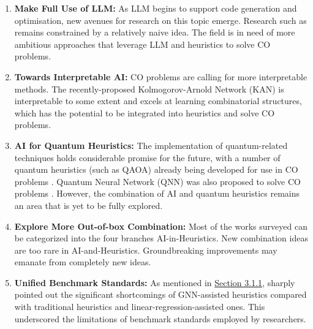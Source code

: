 \documentclass[a4paper]{article}
\begin{document}
\begin{enumerate}
    \item{\textbf{Make Full Use of LLM:}} As LLM begins to support code generation and optimisation, new avenues for research on this topic emerge. Research such as \citet{Ye} remains constrained by a relatively naive idea. The field is in need of more ambitious approaches that leverage LLM and heuristics to solve CO problems.
    \item{\textbf{Towards Interpretable AI:}} CO problems are calling for more interpretable methods. The recently-proposed Kolmogorov-Arnold Network (KAN) \citep{ZLiu} is interpretable to some extent and excels at learning combinatorial structures, which has the potential to be integrated into heuristics and solve CO problems.
    \item{\textbf{AI for Quantum Heuristics:}} The implementation of quantum-related techniques holds considerable promise for the future, with a number of quantum heuristics (such as QAOA) already being developed for use in CO problems \citep{Farhi,Li}. Quantum Neural Network (QNN) was also proposed to solve CO problems \citep{Xinyu}. However, the combination of AI and quantum heuristics remains an area that is yet to be fully explored.
    \item{\textbf{Explore More Out-of-box Combination:}} Most of the works surveyed can be categorized into the four branches AI-in-Heuristics. New combination ideas are too rare in AI-and-Heuristics. Groundbreaking improvements may emanate from completely new ideas.
    \item {\textbf{Unified Benchmark Standards:}} As mentioned in \hyperref[sec:ASG]{Section 3.1.1}, \citet{Ankur} sharply pointed out the significant shortcomings of GNN-assisted heuristics compared with traditional heuristics and linear-regression-assisted ones. This underscored the limitations of benchmark standards employed by researchers.
\end{enumerate}




\end{document}
